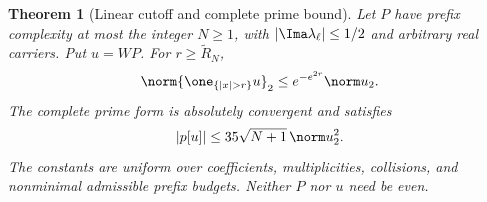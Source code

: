 \documentclass[11pt,a4paper]{article}
\numberwithin{equation}{section}
\newtheorem{theorem}{Theorem}[section]
\theoremstyle{definition}\newtheorem{definition}[theorem]{Definition}
\theoremstyle{remark}\newtheorem{remark}[theorem]{Remark}
\begin{document}
\begin{theorem}[Linear cutoff and complete prime bound]\label{sw:thm:linear-prime}
Let $P$ have prefix complexity at most the integer $N\ge1$, with $|\Ima\lambda_\ell|\le1/2$ and arbitrary real carriers. Put $u=WP$. For $r\ge\widetilde R_N$,
\begin{equation}\label{sw:eq:linear-tail}
 \norm{\one_{\{|x|>r\}}u}_2\le e^{-e^{2r}}\norm u_2.
\end{equation}
The complete prime form is absolutely convergent and satisfies
\begin{equation}\label{sw:eq:prime35}
 |p[u]|\le35\sqrt{N+1}\,\norm u_2^2.
\end{equation}
The constants are uniform over coefficients, multiplicities, collisions, and nonminimal admissible prefix budgets. Neither $P$ nor $u$ need be even.
\end{theorem}
\end{document}
